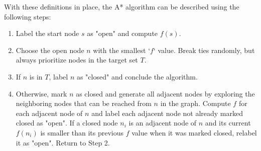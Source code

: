     With these definitions in place, the A* algorithm can be described using the following steps:

    \begin{enumerate}
        \item Label the start node $s$ as "open" and compute $f(s)$.
        \item Choose the open node $n$ with the smallest `$f$` value. Break ties randomly, but always prioritize nodes in the target set $T$.
        \item If $n$ is in $T$, label $n$ as "closed" and conclude the algorithm.
        \item Otherwise, mark $n$ as closed and generate all adjacent nodes by exploring the neighboring nodes that can be reached from $n$ in the graph. Compute $f$ for each adjacent node of $n$ and label each adjacent node not already marked closed as "open". If a closed node $n_i$ is an adjacent node of $n$ and its current $f(n_{i})$ is smaller than its previous $f$ value when it was marked closed, relabel it as "open". Return to Step 2.
    \end{enumerate}

